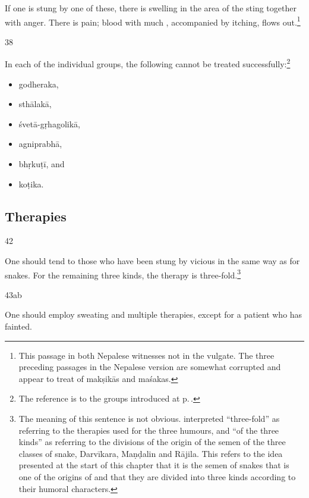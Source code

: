 \begin{translation}
If one is stung by one of these, there is swelling in the area of the sting together 
with anger. 
There is pain; blood with much , accompanied by
itching, flows out.\footnote{This passage in both Nepalese witnesses
    not in the vulgate.  The three preceding passages in the
    Nepalese version are somewhat corrupted and appear to treat of
    \glspl{makṣikā} and \glspl{maśaka}.}

\item[38]

In each of the individual groups, the following cannot be treated 
successfully:\footnote{The reference is to the groups introduced at 
p.\,\pageref{ekajati}.}
\begin{itemize}
    \item \Gls{godheraka},
    \item \Gls{sthālakā}, 
    \item \Gls{śvetā-gṛhagolikā},
    \item \Gls{agniprabhā},
    \item \Gls{bhṛkuṭī}, 
    and
    \item \Gls{koṭika}.
    \end{itemize}


\subsection{Therapies}

\item[42]

One should tend to those who have been stung by vicious
 in the same way as for snakes. For the remaining
three kinds, the therapy is three-fold.\footnote{The meaning of this
    sentence is not obvious.   interpreted
    “three-fold” as referring to the therapies used for the three humours,
    and “of the three kinds” as referring to the divisions of the origin
    of the semen of the three classes of snake, Darvīkara, Maṇḍalin and
    Rājila.  This refers to the idea presented at the start of this
    chapter that it is the semen of snakes that is one of the origins of
     and that they are divided into three kinds
    according to their humoral characters.}


\item[43ab]

One should employ sweating and multiple therapies, except for a patient who has 
fainted. 


\end{translation}
